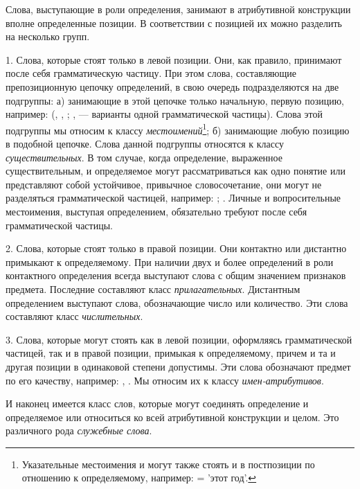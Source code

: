 Слова, выступающие в роли определения, занимают в атрибутивной конструкции вполне определенные позиции. В соответствии с позицией их можно разделить на несколько групп.

1. Слова, которые стоят только в левой позиции. Они, как правило, принимают после себя грамматическую частицу. При этом слова, составляющие препозиционную цепочку определений, в свою очередь подразделяются на две подгруппы:
а) занимающие в этой цепочке только начальную, первую позицию, например:  (, , ; ,  --- варианты одной грамматической частицы). Слова этой подгруппы мы относим к классу \emph{местоимений}\footnote[24]{Указательные местоимения  и  могут также стоять и в постпозиции по отношению к определяемому, например:  =  'этот год'.};
б) занимающие любую позицию в подобной цепочке. Слова данной подгруппы относятся к классу \emph{существительных}. В том случае, когда определение, выраженное существительным, и определяемое могут рассматриваться как одно понятие или представляют собой устойчивое, привычное словосочетание, они могут не разделяться грамматической частицей, например:
;
. Личные и вопросительные местоимения, выступая определением, обязательно требуют после себя грамматической частицы.

2. Слова, которые стоят только в правой позиции. Они контактно или дистантно примыкают к определяемому. При наличии двух и более определений в роли контактного определения всегда выступают слова с общим значением признаков предмета. Последние составляют класс \emph{прилагательных}. Дистантным определением выступают слова, обозначающие число или количество. Эти слова составляют класс \emph{числительных}.

3. Слова, которые могут стоять как в левой позиции, оформляясь грамматической частицей, так и в правой позиции, примыкая к определяемому, причем и та и другая позиции в одинаковой степени допустимы. Эти слова обозначают предмет по его качеству, например:
, .
Мы относим их к классу \emph{имен-атрибутивов}.

И наконец имеется класс слов, которые могут соединять определение и определяемое или относиться ко всей атрибутивной конструкции и целом. Это различного рода \emph{служебные слова}.

